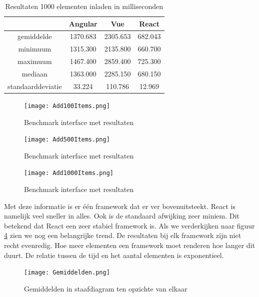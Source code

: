 \begin{table}[h]
\centering
\caption{Resultaten 1000 elementen inladen in milliseconden}
\label{table:resultaten_1000_elementen}
\begin{tabular}{|c|c|c|c|} \hline
		   						&Angular     &Vue        &React      \\ \hline
	gemiddelde			&1370.683     &2305.653  &682.043 \\ \hline
	minimuum			&1315.300    &2135.800  &660.700 \\ \hline
	maximuum			&1467.400    &2859.400  &725.300 \\ \hline
	mediaan				   &1363.000    &2285.150  &680.150 \\ \hline
	standaarddeviatie &33.224       &110.786    &12.969    \\ \hline
\end{tabular}
\end{table}

\begin{figure}[h!]
	\caption{Benchmark interface met resultaten}
	\centering
	\texttt{[image: Add100Items.png]}
	\label{fig:resultaten_100_elementen}
\end{figure}
\begin{figure}[h!]
	\caption{Benchmark interface met resultaten}
	\centering
	\texttt{[image: Add500Items.png]}
	\label{fig:resultaten_500_elementen}
\end{figure}
\begin{figure}[h!]
	\caption{Benchmark interface met resultaten}
	\centering
	\texttt{[image: Add1000Items.png]}
	\label{fig:resultaten_1000_elementen}
\end{figure}

Met deze informatie is er één framework dat er ver bovenuitsteekt. React is namelijk veel sneller in alles. Ook is de standaard afwijking zeer miniem. Dit betekend dat React een zeer stabiel framework is. Als we verderkijken naar figuur \ref{fig:resultaten_gemiddelden} zien we nog een belangrijke trend. De resultaten bij elk framework zijn niet recht evenredig. Hoe meer elementen een framework moet renderen hoe langer dit duurt. De relatie tussen de tijd en het aantal elementen is exponentieel. 

\begin{figure}[h!]
	\caption{Gemiddelden in staafdiagram ten opzichte van elkaar}
	\centering
	\texttt{[image: Gemiddelden.png]}
	\label{fig:resultaten_gemiddelden}
\end{figure}






